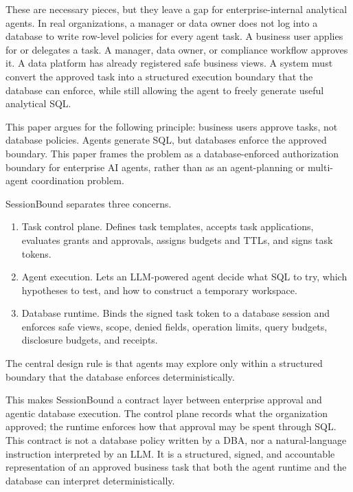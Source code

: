 \documentclass[journal]{IEEEtran}
\providecommand{\tightlist}{%
  \setlength{\itemsep}{0pt}\setlength{\parskip}{0pt}}
\begin{document}
These are necessary pieces, but they leave a gap for enterprise-internal
analytical agents. In real organizations, a manager or data owner does
not log into a database to write row-level policies for every agent
task. A business user applies for or delegates a task. A manager, data
owner, or compliance workflow approves it. A data platform has already
registered safe business views. A system must convert the approved task
into a structured execution boundary that the database can enforce,
while still allowing the agent to freely generate useful analytical SQL.

This paper argues for the following principle: business users approve
tasks, not database policies. Agents generate SQL, but databases enforce
the approved boundary. This paper frames the problem as a
database-enforced authorization boundary for enterprise AI agents,
rather than as an agent-planning or multi-agent coordination problem.

SessionBound separates three concerns.

\begin{enumerate}
\def\labelenumi{\arabic{enumi}.}
\tightlist
\item
  Task control plane. Defines task templates, accepts task
  applications, evaluates grants and approvals, assigns budgets and
  TTLs, and signs task tokens.
\item
  Agent execution. Lets an LLM-powered agent decide what SQL to
  try, which hypotheses to test, and how to construct a temporary
  workspace.
\item
  Database runtime. Binds the signed task token to a database
  session and enforces safe views, scope, denied fields, operation
  limits, query budgets, disclosure budgets, and receipts.
\end{enumerate}

The central design rule is that agents may explore only within a
structured boundary that the database enforces deterministically.

This makes SessionBound a contract layer between enterprise approval and
agentic database execution. The control plane records what the
organization approved; the runtime enforces how that approval may be
spent through SQL. This contract is not a database policy written by a
DBA, nor a natural-language instruction interpreted by an LLM. It is a
structured, signed, and accountable representation of an approved
business task that both the agent runtime and the database can interpret
deterministically.
\end{document}

